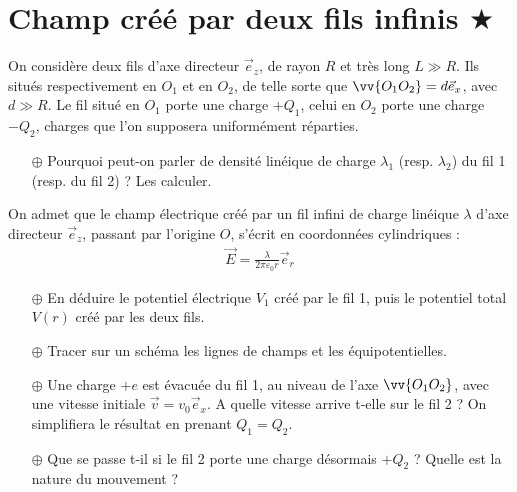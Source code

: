 \documentclass{report}
\begin{document}
\newpage

\section*{Champ créé par deux fils infinis $\bigstar$}

On considère deux fils d'axe directeur $\vec{e}_z$, de rayon $R$ et très long $L\gg R$. Ils situés respectivement en $O_1$ et en $O_2$, de telle sorte que $\vv{O_1O_2}=d\vec{e}_x$, avec $d\gg R$. Le fil situé en $O_1$ porte une charge $+Q_1$, celui en $O_2$ porte une charge $-Q_2$, charges que l'on supposera uniformément réparties. 

\begin{itemize}

	\item[$\oplus$] Pourquoi peut-on parler de densité linéique de charge $\lambda_1$ (resp. $\lambda_2$) du fil 1 (resp. du fil 2) ? Les calculer.

\end{itemize}

On admet que le champ électrique créé par un fil infini de charge linéique $\lambda$ d'axe directeur $\vec{e}_z$, passant par l'origine $O$, s'écrit en coordonnées cylindriques :
\begin{align*}
	\vec{E}=\frac{\lambda}{2\pi\varepsilon_0 r}\vec{e}_r
\end{align*}

\begin{itemize}

	\item[$\oplus$] En déduire le potentiel électrique $V_1$ créé par le fil 1, puis le potentiel total $V(r)$ créé par les deux fils.
	
	\item[$\oplus$] Tracer sur un schéma les lignes de champs et les équipotentielles. 
	
	\item[$\oplus$] Une charge $+e$ est évacuée du fil 1, au niveau de l'axe $\vv{O_1O_2}$, avec une vitesse initiale $\vec{v}=v_0\vec{e}_x$. A quelle vitesse arrive t-elle sur le fil 2 ? On simplifiera le résultat en prenant $Q_1=Q_2$.
	
	\item[$\oplus$] Que se passe t-il si le fil 2 porte une charge désormais $+Q_2$ ? Quelle est la nature du mouvement ? 

\end{itemize}

\newpage
\end{document}
